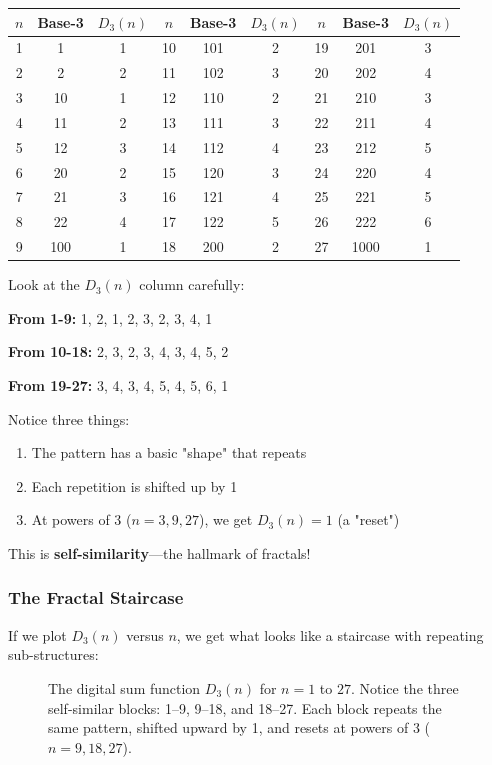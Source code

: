\begin{center}
\begin{tabular}{c|c|c||c|c|c||c|c|c}
$n$ & Base-3 & $D_3(n)$ & $n$ & Base-3 & $D_3(n)$ & $n$ & Base-3 & $D_3(n)$ \\
\hline
1 & 1 & 1 & 10 & 101 & 2 & 19 & 201 & 3 \\
2 & 2 & 2 & 11 & 102 & 3 & 20 & 202 & 4 \\
3 & 10 & 1 & 12 & 110 & 2 & 21 & 210 & 3 \\
4 & 11 & 2 & 13 & 111 & 3 & 22 & 211 & 4 \\
5 & 12 & 3 & 14 & 112 & 4 & 23 & 212 & 5 \\
6 & 20 & 2 & 15 & 120 & 3 & 24 & 220 & 4 \\
7 & 21 & 3 & 16 & 121 & 4 & 25 & 221 & 5 \\
8 & 22 & 4 & 17 & 122 & 5 & 26 & 222 & 6 \\
9 & 100 & 1 & 18 & 200 & 2 & 27 & 1000 & 1 \\
\end{tabular}
\end{center}

\begin{intuitive}
Look at the $D_3(n)$ column carefully:

\textbf{From 1-9:} 1, 2, 1, 2, 3, 2, 3, 4, 1

\textbf{From 10-18:} 2, 3, 2, 3, 4, 3, 4, 5, 2

\textbf{From 19-27:} 3, 4, 3, 4, 5, 4, 5, 6, 1

Notice three things:
\begin{enumerate}
\item The pattern has a basic "shape" that repeats
\item Each repetition is shifted up by 1
\item At powers of 3 ($n = 3, 9, 27$), we get $D_3(n) = 1$ (a "reset")
\end{enumerate}

This is \textbf{self-similarity}—the hallmark of fractals!
\end{intuitive}

\subsubsection*{The Fractal Staircase}

If we plot $D_3(n)$ versus $n$, we get what looks like a staircase with repeating sub-structures:

\begin{figure}[h]
\centering

\caption{The digital sum function $D_3(n)$ for $n = 1$ to $27$. Notice the three self-similar blocks: 1--9, 9--18, and 18--27. Each block repeats the same pattern, shifted upward by 1, and resets at powers of 3 ($n = 9, 18, 27$).}
\label{fig:d3pattern}
\end{figure}

